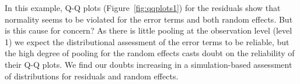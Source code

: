 \documentclass{article} %
\newcommand{\hh}[1]{{\color{orange} #1}}
\newcommand{\al}[1]{{\color{red} #1}}
\begin{document}
%
%


In this example, Q-Q plots (Figure~\ref{fig:qqplots1}) for the residuals show that normality 
seems to be violated for the error terms and both random effects. But is this cause for concern?
\al{As} there is little pooling at the observation level \al{(level 1)} we expect the distributional assessment of the error terms to be reliable, but  the high degree of pooling  for the random effects  casts doubt on the reliability of their Q-Q plots. 
 We find our doubts increasing in a simulation-based assessment of distributions for residuals and random effects.
\end{document}
